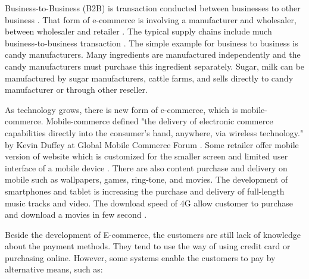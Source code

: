 \documentclass[conference]{IEEEtran}
\begin{document}
Business-to-Business (B2B) is transaction conducted between businesses to other business \cite{ec2010Gary}. That form of e-commerce is involving a manufacturer and wholesaler, between wholesaler and retailer \cite{btb2015}. The typical supply chains include much business-to-business transaction \cite{btb2015}. The simple example for business to business is candy manufacturers. Many ingredients are manufactured independently and the candy manufacturers must purchase this ingredient separately. Sugar, milk can be manufactured by sugar manufacturers, cattle farms, and sells directly to candy manufacturer or through other reseller.

As technology grows, there is new form of e-commerce, which is mobile-commerce. Mobile-commerce defined "the delivery of electronic commerce capabilities directly into the consumer’s hand, anywhere, via wireless technology." by Kevin Duffey at Global Mobile Commerce Forum \cite{defmobiec}. Some retailer offer mobile version of website which is customized for the smaller screen and limited user interface of a mobile device \cite{ectomobile2015}. There are also content purchase and delivery on mobile such as wallpapers, games, ring-tone, and movies. The development of smartphones and tablet is increasing the purchase and delivery of full-length music tracks and video. The download speed of 4G allow customer to purchase and download a movies in few second \cite{niranjanamurthy2013analysis}.

Beside the development of E-commerce, the customers are still lack of knowledge about the payment methods. They tend to use the way of using credit card or purchasing online. However, some systems enable the customers to pay by alternative means, such as:
\end{document}

